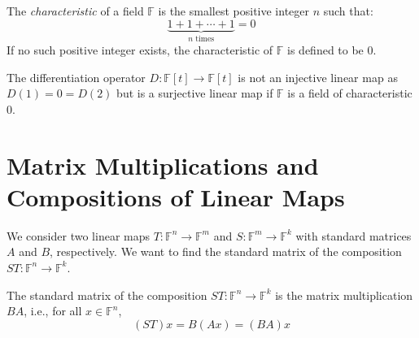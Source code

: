 \documentclass[
	11pt, %
	fleqn, %
	a4paper, %
]{LegrandOrangeBook}
\newcommand{\F}{\mathbb{F}} %
\begin{document}
\begin{definition}
    The \emph{characteristic} of a field $\F$ is the smallest positive integer $n$ such that:
    \[
        \underbrace{1 + 1 + \cdots + 1}_{n \text{ times}} = 0
    \]
    If no such positive integer exists, the characteristic of $\F$ is defined to be $0$.    
\end{definition}

\begin{example}
    The differentiation operator $D: \F[t] \to \F[t]$ is not an injective linear map as $D(1) = 0 = D(2)$ but is a surjective linear map if $\F$ is a field of characteristic $0$.
\end{example}


\newpage

\section{Matrix Multiplications and Compositions of Linear Maps}

We consider two linear maps $T: \F^n \to \F^m$ and $S: \F^m \to \F^k$ with standard matrices $A$ and $B$, respectively. We want to find the standard matrix of the composition $ST: \F^n \to \F^k$.

\begin{center}
\end{center}

\begin{proposition}
    The standard matrix of the composition $ST: \F^n \to \F^k$ is the matrix multiplication $BA$, i.e., for all $x \in \F^n$,
    \[
        (ST)x = B(Ax) = (BA)x
    \]
\end{proposition}
\end{document}
